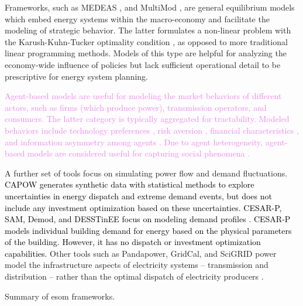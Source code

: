 Frameworks, such as MEDEAS \cite{capellan-perez_medeas_2020}, and MultiMod
\cite{huppmann_market_2014}, are general equilibrium models which embed energy
systems within the macro-economy and facilitate the modeling of strategic
behavior. The latter formulates a non-linear problem with the Karush-Kuhn-Tucker
optimality condition \cite{huppmann_market_2014}, as opposed to more traditional
linear programming methods. Models of this type are helpful for analyzing the
economy-wide influence of policies but lack sufficient operational detail to be
prescriptive for energy system planning.

\textcolor{violet}{Agent-based models are useful for modeling the market
behaviors of different actors, such as firms (which produce power), transmission
operators, and consumers. The latter category is typically aggregated for
tractability. Modeled behaviors include technology preferences
\cite{anwar_modeling_2022, zade_quantifying_2020}, risk aversion
\cite{anwar_modeling_2022}, financial characteristics \cite{anwar_modeling_2022,
nitsch_economic_2021}, and information asymmetry among agents
\cite{anwar_modeling_2022, nitsch_economic_2021}. Due to agent heterogeneity,
agent-based models are considered useful for capturing social phenomena
\cite{yue_review_2018,fattahi_systemic_2020}.}

A further set of tools focus on simulating power flow and demand fluctuations.
\textcolor{black}{CAPOW \cite{su_open_2020} generates synthetic data with
statistical methods to explore uncertainties in energy dispatch and extreme
demand events, but does not include any investment optimization based on these
uncertainties.} \textcolor{black}{CESAR-P, SAM, Demod, and DESSTinEE focus on
modeling demand profiles
\cite{leoniefierz_hues-platformcesar-p-core_2021,bosmann_shape_2015,barsanti_socio-technical_2021}.
CESAR-P models individual building demand for energy based on the physical
parameters of the building. However, it has no dispatch or investment
optimization capabilities.} Other tools such as Pandapower, GridCal, and SciGRID
power model the infrastructure aspects of electricity systems -- transmission
and distribution -- rather than the optimal dispatch of electricity producers
\cite{thurner_pandapower_2018, vera_gridcal_2022, matke_structure_2017}.

\begin{table}
    \centering
    \caption{Summary of \ac{esom} frameworks.}
    \label{tab:esoms}
    \resizebox*{\textwidth}{0.95\textheight}{}
\end{table}



